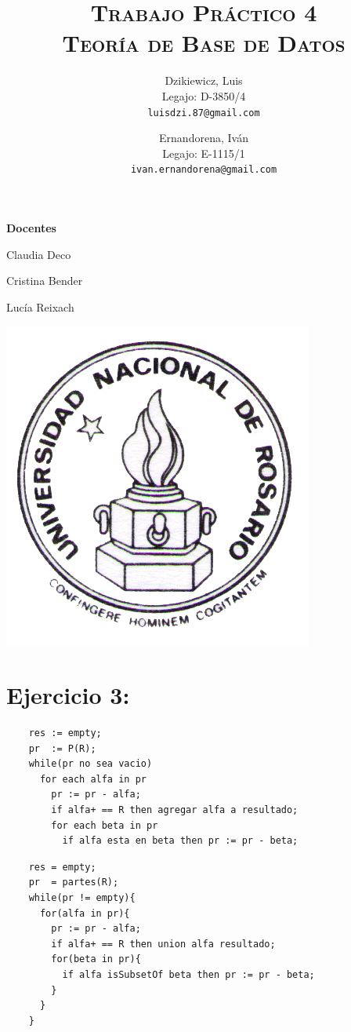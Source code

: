 \documentclass[a4paper]{article}
\author{
        Dzikiewicz, Luis\\
        Legajo: D-3850/4\\
        \texttt{luisdzi.87@gmail.com}
        \and Ernandorena, Iván\\
        Legajo: E-1115/1\\
        \texttt{ivan.ernandorena@gmail.com}
}
\date{}
\title {
    \Huge  \textsc{Trabajo Práctico 4\\}
    \large \textsc{Teoría de Base de Datos}
}
\begin{document}
    \maketitle

    \thispagestyle{empty}

    \begin{center}
         \large \bf Docentes
    \end{center}

    \begin{center}

        Claudia Deco  

        Cristina Bender

        Lucía Reixach 
        \vspace{2cm}

        \includegraphics[scale=1.5]{Logo-Unr}


    \end{center}






    \newpage


    \section*{Ejercicio 3:}
    \begin{verbatim}
    res := empty;
    pr  := P(R);
    while(pr no sea vacio)
      for each alfa in pr
        pr := pr - alfa;
        if alfa+ == R then agregar alfa a resultado;
        for each beta in pr
          if alfa esta en beta then pr := pr - beta;  
    \end{verbatim}

    \begin{verbatim}
    res = empty;
    pr  = partes(R);
    while(pr != empty){
      for(alfa in pr){
        pr := pr - alfa;
        if alfa+ == R then union alfa resultado;
        for(beta in pr){
          if alfa isSubsetOf beta then pr := pr - beta;
        }
      }
    } 
    \end{verbatim}
\end{document}
